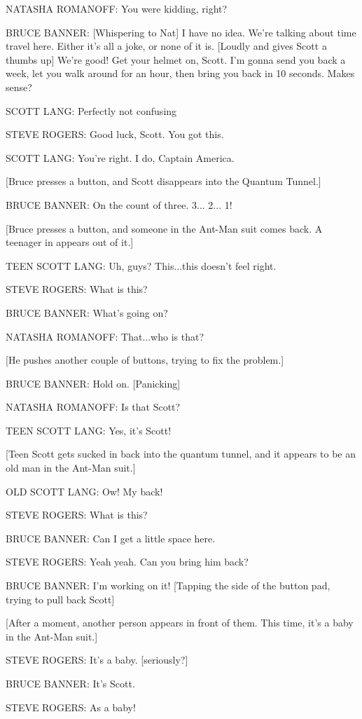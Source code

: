 NATASHA ROMANOFF: You were kidding, right?

BRUCE BANNER: [Whispering to Nat] I have no idea. We're talking about time travel here. Either it's all a joke, or none of it is. [Loudly and gives Scott a thumbs up] We're good! Get your helmet on, Scott. I'm gonna send you back a week, let you walk around for an hour, then bring you back in 10 seconds. Makes sense?

SCOTT LANG: Perfectly not confusing

STEVE ROGERS: Good luck, Scott. You got this.

SCOTT LANG: You're right. I do, Captain America.

[Bruce presses a button, and Scott disappears into the Quantum Tunnel.]

BRUCE BANNER: On the count of three. 3... 2... 1!

[Bruce presses a button, and someone in the Ant-Man suit comes back. A teenager in appears out of it.]

TEEN SCOTT LANG: Uh, guys? This...this doesn't feel right.

STEVE ROGERS: What is this?

BRUCE BANNER: What's going on?

NATASHA ROMANOFF: That...who is that?

[He pushes another couple of buttons, trying to fix the problem.]

BRUCE BANNER: Hold on. [Panicking]

NATASHA ROMANOFF: Is that Scott?

TEEN SCOTT LANG: Yes, it's Scott!

[Teen Scott gets sucked in back into the quantum tunnel, and it appears to be an old man in the Ant-Man suit.]

OLD SCOTT LANG: Ow! My back!

STEVE ROGERS: What is this?

BRUCE BANNER: Can I get a little space here.

STEVE ROGERS: Yeah yeah. Can you bring him back?

BRUCE BANNER: I'm working on it! [Tapping the side of the button pad, trying to pull back Scott]

[After a moment, another person appears in front of them. This time, it's a baby in the Ant-Man suit.]

STEVE ROGERS: It's a baby. [seriously?]

BRUCE BANNER: It's Scott.

STEVE ROGERS: As a baby!

